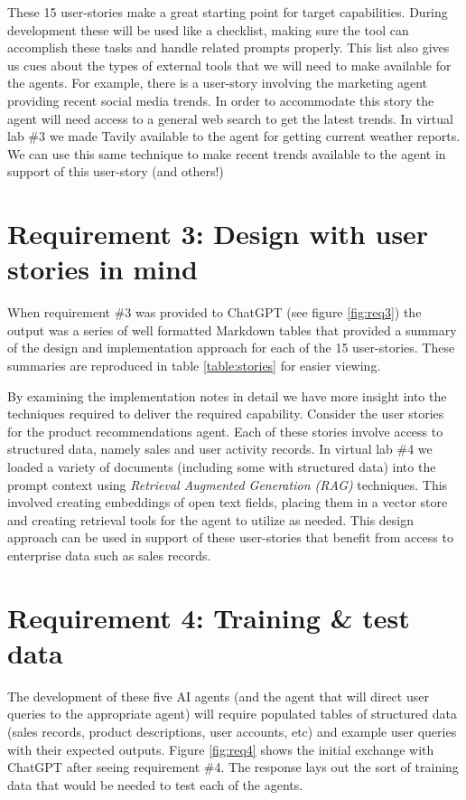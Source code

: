 \documentclass[11pt,letterpaper]{article}
\begin{document}
These 15 user-stories make a great starting point for target capabilities. During development these will be used like a checklist, making sure the tool can accomplish these tasks and handle related prompts properly. This list also gives us cues about the types of external tools that we will need to make available for the agents. For example, there is a user-story involving the marketing agent providing recent social media trends. In order to accommodate this story the agent will need access to a general web search to get the latest trends. In virtual lab \#3 we made Tavily available to the agent for getting current weather reports. We can use this same technique to make recent trends available to the agent in support of this user-story (and others!)

\section*{Requirement 3: Design with user stories in mind}
\tab When requirement \#3 was provided to ChatGPT (see figure \ref{fig:req3}) the output was a series of well formatted Markdown tables that provided a summary of the design and implementation approach for each of the 15 user-stories. These summaries are reproduced in table \ref{table:stories} for easier viewing.

By examining the implementation notes in detail we have more insight into the techniques required to deliver the required capability. Consider the user stories for the product recommendations agent. Each of these stories involve access to structured data, namely sales and user activity records. In virtual lab \#4 we loaded a variety of documents (including some with structured data) into the prompt context using \textit{Retrieval Augmented Generation (RAG)} techniques. This involved creating embeddings of open text fields, placing them in a vector store and creating retrieval tools for the agent to utilize as needed.
This design approach can be used in support of these user-stories that benefit from access to enterprise data such as sales records.

\section*{Requirement 4: Training \& test data}
\tab The development of these five AI agents (and the agent that will direct user queries to the appropriate agent) will require populated tables of structured data (sales records, product descriptions, user accounts, etc) and example user queries with their expected outputs.
Figure \ref{fig:req4} shows the initial exchange with ChatGPT after seeing requirement \#4. The response lays out the sort of training data that would be needed to test each of the agents. 
\end{document}
